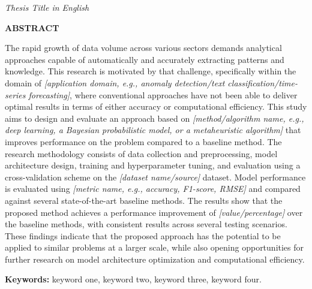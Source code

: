 \thispagestyle{empty}
\begin{center}
\textit{Thesis Title in English}\par
\vspace{6mm}
{\bfseries ABSTRACT\par}
\vspace{10mm}
\end{center}

\noindent The rapid growth of data volume across various sectors demands analytical approaches capable of automatically and accurately extracting patterns and knowledge. This research is motivated by that challenge, specifically within the domain of \textit{[application domain, e.g., anomaly detection/text classification/time-series forecasting]}, where conventional approaches have not been able to deliver optimal results in terms of either accuracy or computational efficiency. This study aims to design and evaluate an approach based on \textit{[method/algorithm name, e.g., deep learning, a Bayesian probabilistic model, or a metaheuristic algorithm]} that improves performance on the problem compared to a baseline method. The research methodology consists of data collection and preprocessing, model architecture design, training and hyperparameter tuning, and evaluation using a cross-validation scheme on the \textit{[dataset name/source]} dataset. Model performance is evaluated using \textit{[metric name, e.g., accuracy, F1-score, RMSE]} and compared against several state-of-the-art baseline methods. The results show that the proposed method achieves a performance improvement of \textit{[value/percentage]} over the baseline methods, with consistent results across several testing scenarios. These findings indicate that the proposed approach has the potential to be applied to similar problems at a larger scale, while also opening opportunities for further research on model architecture optimization and computational efficiency.

\vspace{6mm}
\noindent\textbf{Keywords:} keyword one, keyword two, keyword three, keyword four.
\clearpage
